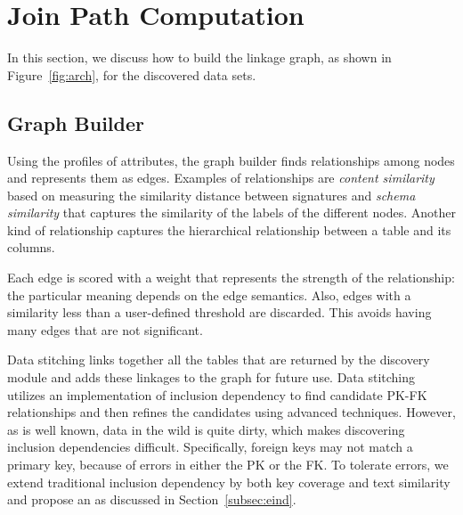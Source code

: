 \section{Join Path Computation}
\label{sec:stitching}

In this section, we discuss how to build the linkage graph, as shown in Figure~\ref{fig:arch}, for the discovered data sets.

\subsection{Graph Builder}


Using the profiles of attributes, the graph builder finds relationships among nodes and represents them as edges. Examples of relationships are \emph{content similarity} based on measuring the similarity
distance between signatures and \emph{schema similarity} that captures the
similarity of the labels of the different nodes. Another kind of relationship
captures the hierarchical relationship between a table and its columns.


Each edge is scored with a weight that represents the strength of the relationship: the particular meaning
depends on the edge semantics.  Also, edges with a
similarity less than a user-defined threshold are discarded.  This avoids having
many edges that are not significant.




Data stitching links together all the tables that are 
returned by the discovery module
and adds these linkages to the graph for future use. 
Data stitching utilizes an implementation of inclusion dependency to find candidate PK-FK relationships and then refines the candidates using advanced techniques. However, as is well known, data in the wild is quite dirty, which makes discovering inclusion dependencies difficult.  Specifically, foreign keys may not match a primary key, because of errors in either the PK or the FK. To tolerate errors, we extend traditional inclusion dependency by both key coverage and text similarity and propose an \emph{\eind} as discussed in Section~\ref{subsec:eind}.

